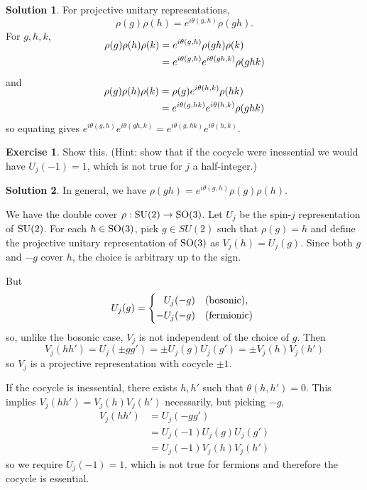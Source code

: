 \documentclass[11pt, a4paper]{report}
\theoremstyle{definition}
\newtheorem{exercise}{Exercise}[part]
\newtheorem{solution}{Solution}[part]
\newenvironment{ex}{\begin{exercise}}{\end{exercise}\pagebreak[1]}
\newenvironment{sol}{\begin{solution}}{\end{solution}\pagebreak[3]}
\newcommand*{\SO}{\ensuremath\text{SO}}
\newcommand*{\SU}{\ensuremath\text{SU}}
\begin{document}
\begin{sol}

For projective unitary representations,
\[
    \rho(g) \rho(h) = e^{i\theta(g, h)} \rho(gh).
\]
For $g, h, k$,
\begin{align*}
    \SwapAboveDisplaySkip
    \rho(g) \rho(h) \rho(k) &= e^{i\theta(g, h)} \rho(gh) \rho(k) \\
                            &= e^{i\theta(g, h)} e^{i\theta(gh, k)} \rho(ghk)
\end{align*}
and
\begin{align*}
    \SwapAboveDisplaySkip
    \rho(g) \rho(h) \rho(k) &= \rho(g) e^{i\theta(h, k)} \rho(hk) \\
                            &= e^{i\theta(g, hk)} e^{i\theta(h, k)} \rho(ghk)
\end{align*}
so equating gives $e^{i\theta(g, h)} e^{i\theta(gh, k)} = e^{i\theta(g, hk)} e^{i\theta(h, k)}$.

\end{sol}

\begin{ex}

Show this.
(Hint: show that if the cocycle were inessential we would have $U_j(-1) = 1$, which is not true for $j$ a half-integer.)

\end{ex}

\begin{sol}

In general, we have $\rho(gh) = e^{i\theta(g, h)} \rho(g) \rho(h)$.

We have the double cover $\rho: \SU(2) \to \SO(3)$.
Let $U_j$ be the spin-$j$ representation of $\SU(2)$.
For each $h \in \SO(3)$, pick $g \in SU(2)$ such that $\rho(g) = h$ and define the projective unitary representation of $\SO(3)$ as $V_j(h) = U_j(g)$.
Since both $g$ and $-g$ cover $h$, the choice is arbitrary up to the sign.

But
\[
    U_j(g) = \begin{dcases*}
                \phantom{-} U_j(-g) & \text{(bosonic)}, \\
                -U_j(-g)            & \text{(fermionic)}
             \end{dcases*}
\]
so, unlike the bosonic case, $V_j$ is not independent of the choice of $g$.
Then
\[
    V_j(hh') = U_j(\pm gg') = \pm U_j(g) U_j(g') = \pm V_j(h) V_j(h')
\]
so $V_j$ is a projective representation with cocycle $\pm1$.

If the cocycle is inessential, there exists $h, h'$ such that $\theta(h, h') = 0$.
This implies $V_j(hh') = V_j(h) V_j(h')$ necessarily, but picking $-g$,
\begin{align*}
    V_j(hh') &= U_j(-gg') \\
             &= U_j(-1) U_j(g) U_j(g') \\
             &= U_j(-1) V_j(h) V_j(h')
\end{align*}
so we require $U_j(-1) = 1$, which is not true for fermions and therefore the cocycle is essential.

\end{sol}
\end{document}
